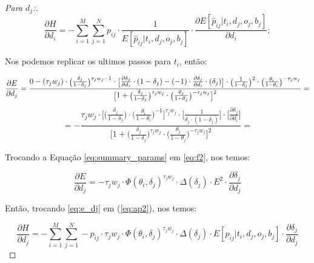 \begin{proof}[Para $d_j$:]

    \begin{equation}
        \label{eq:ap2}
            \frac{\partial H}{\partial d_i} = - \sum_{i=1}^{M}\sum_{j=1}^{N} p_{ij}\cdot \frac{1}{E[\hat{p}_{ij} | t_i, d_j, o_j, b_j]} \cdot \frac{\partial E[\hat{p}_{ij} | t_i, d_j, o_j, b_j]}{\partial d_i};
    \end{equation}

    \noindent Nos podemos replicar os ultimos passos para $t_i$, então:

    \begin{equation}
    \tiny
        \frac{\partial E}{\partial d_j} = \frac{0 - (\tau_j w_j)\cdot\big(\frac{\delta_j}{1 - \delta_j}\big)^{\tau_j w_j - 1}\cdot \bigg[\frac{\partial \delta_j}{\partial d_i}\cdot (1 - \delta_j) - ( -1)\cdot \frac{\partial \delta_j}{\partial d_i}\cdot (\delta_j)\bigg]\cdot \big(\frac{1}{1 - \delta_j}\big)^{2}\cdot\big(\frac{\theta_i}{1 - \theta_i}\big)^{-\tau_j w_j}}{
        \bigg[1 + \big(\frac{\delta_j}{1 - \delta_j}\big)^{\tau_j w_j}\cdot \big(\frac{\theta_j}{1 - \theta_j}\big)^{-\tau_j w_j}\bigg]^{2}
            } = 
    \end{equation}
    \begin{equation}
        \label{eq:f2}
        = -\frac{\tau_j w_j\cdot \bigg[\big(\frac{\delta_j}{1 - \delta_j}\big)\cdot \big(\frac{\theta_i}{1 - \theta_i}\big)^{-1}\bigg]^{\tau_j w_j}\cdot  \big[\frac{1}{\delta_j\cdot(1 - \delta_j)}\big]\cdot \big[\frac{\partial \delta_j}{\partial d_i}\big]}{
            \bigg[1 + \big(\frac{\delta_j}{1 - \delta_j}\big)^{\tau_j w_j}\cdot \big(\frac{\theta_j}{1 - \theta_j}\big)^{-\tau_j w_j}\bigg]^{2}
            } = 
    \end{equation}

    \noindent  Trocando a Equação \ref{eq:summary_params} em \ref{eq:f2}, nos temos:

    \begin{equation}
        \label{eq:e_dj}
        \frac{\partial E}{\partial d_j}  = -\tau_j w_j \cdot \Phi(\theta_i, \delta_j)^{\tau_j w_j} \cdot \Delta(\delta_j) \cdot E^{2} \cdot \frac{\partial \delta_j}{\partial d_j}
    \end{equation}    

    \noindent Então, trocando \ref{eq:e_dj} em (\ref{eq:ap2}), nos temos:

    \begin{equation}
        \frac{\partial H}{\partial d_j} = - \sum_{i=1}^{M}\sum_{j=1}^{N} - p_{ij}\cdot \tau_j w_j \cdot \Phi(\theta_i, \delta_j)^{\tau_j w_j} \cdot \Delta(\delta_j) \cdot E[\hat{p}_{ij} | t_i, d_j, o_j, b_j]\cdot \frac{\partial \delta_j}{\partial d_j}
    \end{equation}


\end{proof}
